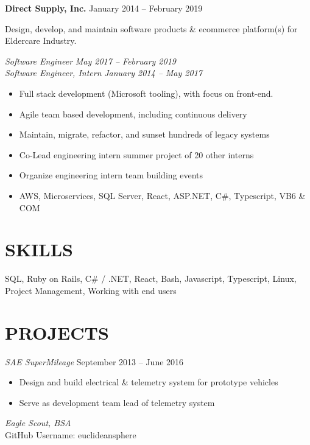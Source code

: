 \documentclass[line,margin]{res}
\begin{document}
\begin{resume}
	\textbf{Direct Supply, Inc.} \hfill January 2014 -- February 2019

	Design, develop, and maintain software products \& ecommerce platform(s) for Eldercare Industry.
	
	{\sl Software Engineer} \hfill {\sl May 2017 -- February 2019} \\
	{\sl Software Engineer, Intern} \hfill {\sl January 2014 -- May 2017} \\

	\begin{itemize}
		\item Full stack development (Microsoft tooling), with focus on front-end.
		\item Agile team based development, including continuous delivery
		\item Maintain, migrate, refactor, and sunset hundreds of legacy systems
		\item Co-Lead engineering intern summer project of 20 other interns
		\item Organize engineering intern team building events
		\item AWS, Microservices, SQL Server, React, ASP.NET, C\#, Typescript, VB6 \& COM
	\end{itemize}

\section{SKILLS}
	SQL, Ruby on Rails, C\# / .NET, React, Bash, Javascript, Typescript, Linux, \\ Project Management, Working with end users

\section{PROJECTS}

	{\sl SAE SuperMileage} \hfill September 2013 -- June 2016
	\begin{itemize}
		\item Design and build electrical \& telemetry system for prototype vehicles
		\item Serve as development team lead of telemetry system
	\end{itemize}

	{\sl Eagle Scout, BSA} \\

	GitHub Username: euclideansphere

\end{resume}
\end{document}
